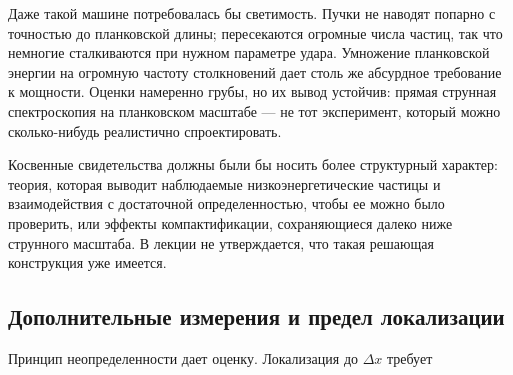 Даже такой машине потребовалась бы светимость. Пучки не наводят попарно с точностью до планковской длины; пересекаются огромные числа частиц, так что немногие сталкиваются при нужном параметре удара. Умножение планковской энергии на огромную частоту столкновений дает столь же абсурдное требование к мощности. Оценки намеренно грубы, но их вывод устойчив: прямая струнная спектроскопия на планковском масштабе — не тот эксперимент, который можно сколько-нибудь реалистично спроектировать.

Косвенные свидетельства должны были бы носить более структурный характер: теория, которая выводит наблюдаемые низкоэнергетические частицы и взаимодействия с достаточной определенностью, чтобы ее можно было проверить, или эффекты компактификации, сохраняющиеся далеко ниже струнного масштаба. В лекции не утверждается, что такая решающая конструкция уже имеется.

\subsection{Дополнительные измерения и предел локализации}

\begin{classroomqa}
\end{classroomqa}

\begin{classroomqa}
\end{classroomqa}

Принцип неопределенности дает оценку. Локализация до \(\Delta x\) требует

